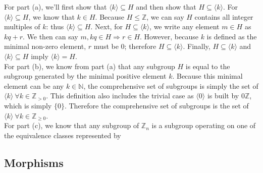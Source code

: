 \documentclass[12pt]{article}
\newcommand{\Z}{\mathbb{Z}}
\newcommand{\N}{\mathbb{N}}
\numberwithin{problem}{section} %
\theoremstyle{remark}  %
\newenvironment{answer}
    {\begin{adjustwidth}{0pt}{0pt}}
    {\end{adjustwidth}}
\begin{document}
    \begin{answer}
        For part (a), we'll first show that $\langle k \rangle \subseteq H$ and then show that $H \subseteq \langle k \rangle$. For $\langle k \rangle \subseteq H$, we know that $k\in H$. Because $H\leqslant \Z$, we can say $H$ contains all integer multiples of $k$: thus $\langle k \rangle \subseteq H$. Next, for $H \subseteq \langle k \rangle$, we write any element $m\in H$ as $kq+r$. We then can say $m,kq\in H \Rightarrow r \in H$. However, because $k$ is defined as the minimal non-zero element, $r$ must be $0$; therefore $H \subseteq \langle k \rangle$. Finally, $H \subseteq \langle k \rangle$ and $\langle k \rangle \subseteq H$ imply $\langle k \rangle = H$. \vspace{5pt} \\ For part (b), we know from part (a) that any subgroup $H$ is equal to the subgroup generated by the minimal positive element $k$. Because this minimal element can be any $k\in\N$, the comprehensive set of subgroups is simply the set of $\langle k \rangle \ \forall k\in\Z_{> 0}$. This definition also includes the trivial case as $\langle 0 \rangle$ is built by $0\Z$, which is simply $\{0\}$. Therefore the comprehensive set of subgroups is the set of $\langle k \rangle \ \forall k\in\Z_{\geq0}$. \vspace{5pt} \\ For part (c), we know that any subgroup of $\Z_n$ is a subgroup operating on one of the equivalence classes represented by 
    \end{answer}

\subsection{Morphisms}
\end{document}
